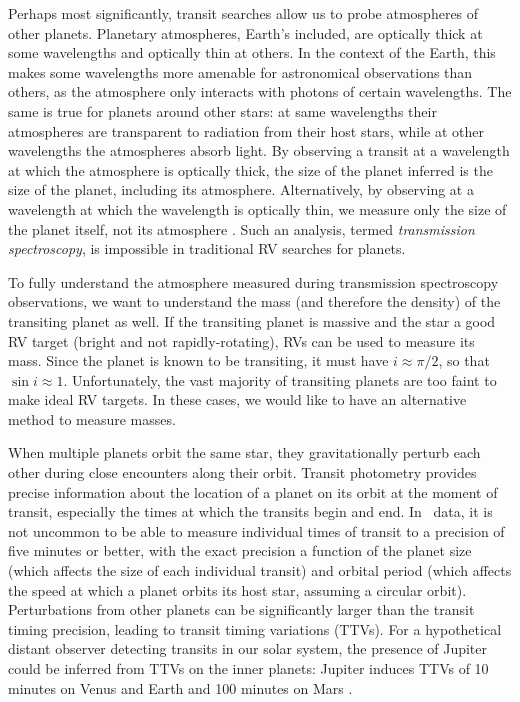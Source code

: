 Perhaps most significantly, transit searches allow us to probe atmospheres of
other planets.
Planetary atmospheres, Earth's included, are optically thick at some wavelengths and
optically thin at others. 
In the context of the Earth, this makes some wavelengths more amenable for astronomical
observations than others, as the atmosphere only interacts with photons of certain wavelengths.
The same is true for planets around other stars: at same wavelengths their atmospheres
are transparent to radiation from their host stars, while at other wavelengths
the atmospheres absorb light.
By observing a transit at a wavelength at which the atmosphere is optically thick, the
size of the planet inferred is the size of the planet, including its atmosphere.
Alternatively, by observing at a wavelength at which the wavelength is optically thin,
we measure only the size of the planet itself, not its atmosphere \citep[e.g.][]{Knutson11, Knutson14}. 
Such an analysis, termed \textit{transmission spectroscopy}, is impossible in traditional RV searches for planets.

To fully understand the atmosphere measured during transmission spectroscopy observations,
we want to understand the mass (and therefore the density) of the transiting planet as
well.
If the transiting planet is massive and the star a good RV target (bright and not 
rapidly-rotating), RVs can be used to measure its mass. 
Since the planet is known to be transiting, it must have $i \approx \pi/2$, so that
$\sin i \approx 1$. 
Unfortunately, the vast majority of transiting planets are too faint to make ideal
RV targets.
In these cases, we would like to have an alternative method to measure masses.

When multiple planets orbit the same star, they gravitationally perturb each other
during close encounters along their orbit.
Transit photometry provides precise information about the location of a planet on its 
orbit at the moment of transit, especially the times at which the transits
begin and end.
In \kep\ data, it is not uncommon to be able to measure individual times of transit to a
precision of five minutes or better, with the exact precision a function of the 
planet size (which affects the size of each individual transit) and orbital period
(which affects the speed at which a planet orbits its host star, assuming a 
circular orbit).
Perturbations from other planets can be significantly larger than the transit timing
precision, leading to transit timing variations (TTVs). 
For a hypothetical distant observer detecting transits in our solar system, the
presence of Jupiter could be inferred from TTVs on the inner planets: 
Jupiter induces TTVs of 10 minutes on Venus and Earth and 100 minutes on Mars
\citep{Agol05, Holman05}.

